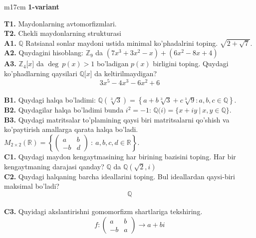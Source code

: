 \documentclass{article}
\begin{document}


\begin{tabular}{m{17cm}}
\textbf{1-variant}
\newline

\textbf{T1.} Maydonlarning avtomorfizmlari. \\
\textbf{T2.} Chekli maydonlarning strukturasi \\
\textbf{A1.} \(\mathbb{Q}\) Ratsianal sonlar maydoni ustida minimal ko'phadalrini toping.
\(\sqrt{2 + \sqrt{7}}\). \\
\textbf{A2.} Quydagini hisoblang:
\(\mathbb{Z}_{9}\) da \(\left( 7x^{3} + 3x^{2} - x \right) + \left( 6x^{2} - 8x + 4 \right)\) \\
\textbf{A3.} \(\mathbb{Z}_{4}\lbrack x\rbrack\) da \(\deg\ p(x) > 1\) bo'ladigan \(p(x)\) birligini toping. Quydagi ko'phadlarning qaysilari \(\mathbb{Q\lbrack}x\rbrack\) da keltirilmaydigan?
\[3x^{5} - 4x^{3} - 6x^{2} + 6\] \\
\textbf{B1.} Quydagi halqa bo'ladimi:
\(\mathbb{Q}\left( \sqrt[3]{3} \right) = \left\{ a + b\sqrt[3]{3} + c\sqrt[3]{9}:a,b,c \in \mathbb{Q} \right\}\). \\
\textbf{B2.} Quydagilar halqa bo'ladimi bunda \(i^{2} = - 1\):
\(\mathbb{Q(}i) = \{ x + iy\ |\ x,y \in \mathbb{Q\}}\). \\
\textbf{B3.} Quydagi matritsalar to'plamining qaysi biri matritsalarni qo'shish va ko'paytirish amallarga qarata halqa bo'ladi.
\(M_{2 \times 2}\mathbb{(R) =}\left\{ \begin{pmatrix}
a & b \\
 - b & d
\end{pmatrix}\ :\ a,b,c,d \in \mathbb{R} \right\}\). \\
\textbf{C1.} Quydagi maydon kengaytmasining har birining bazisini toping. Har bir kengaytmaning darajasi qanday?
\(\mathbb{Q}\) da \(\mathbb{Q}\left( \sqrt{2},i \right)\) \\
\textbf{C2.} Quydagi halqaning barcha ideallarini toping. Bul ideallardan qaysi-biri maksimal bo'ladi?
\[\mathbb{Q}\] \\
\textbf{C3.} Quyidagi akslantirishni gomomorfizm shartlariga tekshiring.
\[f:\begin{pmatrix}
a & b \\
 - b & a
\end{pmatrix} \rightarrow a + bi\] \\

\end{tabular}
\vspace{1cm}
\end{document}
